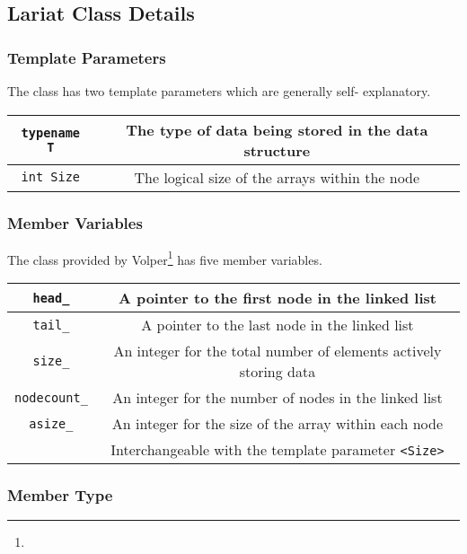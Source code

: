 \subsection{Lariat Class Details}


\subsubsection{Template Parameters}
\indent The  class has two template parameters which are generally self-
explanatory.
\\

\begin{tabular}{|c|c|}
	\hline
	\texttt{typename T} & The type of data being stored in the data structure \\
	\hline
	\texttt{int Size}   & The logical size of the arrays within the node      \\
	\hline
\end{tabular}



\subsubsection{Member Variables}
\indent The  class provided by Volper\footnote{\surprisevolpy} has five member variables.
\\


\begin{tabular}{|c|c|}
	\hline
	\texttt{head_}      & A pointer to the first node in the linked list                       \\
	\hline
	\texttt{tail_}      & A pointer to the last node in the linked list                        \\
	\hline
	\texttt{size_}      & An integer for the total number of elements actively storing data    \\
	\hline
	\texttt{nodecount_} & An integer for the number of nodes in the linked list                \\
	\hline
	\texttt{asize_}     & An integer for the size of the array within each node                \\
	                             & Interchangeable with the template parameter \texttt{<Size>} \\
	\hline
\end{tabular}


\subsubsection{Member Type}

